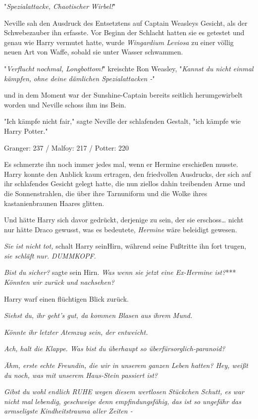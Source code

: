 {"\emph{Spezialattacke, Chaotischer} \emph{Wirbel!}"

Neville sah den Ausdruck des Entsetztens auf Captain Weasleys Gesicht, als der Schwebezauber ihn erfasste. Vor Beginn der Schlacht hatten sie es getestet und genau wie Harry vermutet hatte, wurde \emph{Wingardium Leviosa} zu einer völlig neuen Art von Waffe, sobald sie unter Wasser schwammen.

"\emph{Verflucht} \emph{nochmal, Longbottom!}" kreischte Ron Weasley, "\emph{Kannst du nicht einmal} \emph{kämpfen,} \emph{ohne deine dämlichen Spezialattacken -}"

und in dem Moment war der Sunshine-Captain bereits seitlich herumgewirbelt worden und Neville schoss ihm ins Bein.

"Ich kämpfe nicht fair," sagte Neville der schlafenden Gestalt, "ich kämpfe wie Harry Potter."

\later

Granger: 237 / Malfoy: 217 / Potter: 220

Es schmerzte ihn noch immer jedes mal, wenn er Hermine erschießen musste. Harry konnte den Anblick kaum ertragen, den friedvollen Ausdrucks, der sich auf ihr schlafendes Gesicht gelegt hatte, die nun ziellos dahin treibenden Arme und die Sonnenstrahlen, die über ihre Tarnuniform und die Wolke ihres kastanienbraunen Haares glitten.

Und hätte Harry sich davor gedrückt, derjenige zu sein, der sie erschoss… nicht nur hätte Draco gewusst, was es bedeutete, \emph{Hermine} wäre beleidigt gewesen.

\emph{Sie ist nicht tot,} schalt Harry seinHirn, während seine Fußtritte ihn fort trugen, \emph{sie schläft nur. DUMMKOPF.}

\emph{Bist du sicher?} sagte sein Hirn. \emph{Was wenn sie jetzt eine Ex-Hermine ist?}*** \emph{Könnten wir zurück und nachsehen?}

Harry warf einen flüchtigen Blick zurück.

\emph{Siehst du, ihr geht's gut, da kommen Blasen aus ihrem Mund.}

\emph{Könnte ihr letzter Atemzug sein, der entweicht.}

\emph{Ach, halt die Klappe. Was bist du überhaupt so überfürsorglich-paranoid?}

\emph{Ähm, erste echte Freundin, die wir in unserem ganzen Leben hatten? Hey, weißt du noch, was mit unserem Haus-Stein passiert ist?}

\emph{Gibst du wohl endlich RUHE wegen diesem wertlosen Stückchen Schutt, es war nicht mal lebendig, geschweige denn empfindungsfähig, das ist so ungefähr das armseligste Kindheitstrauma aller Zeiten -}

}
